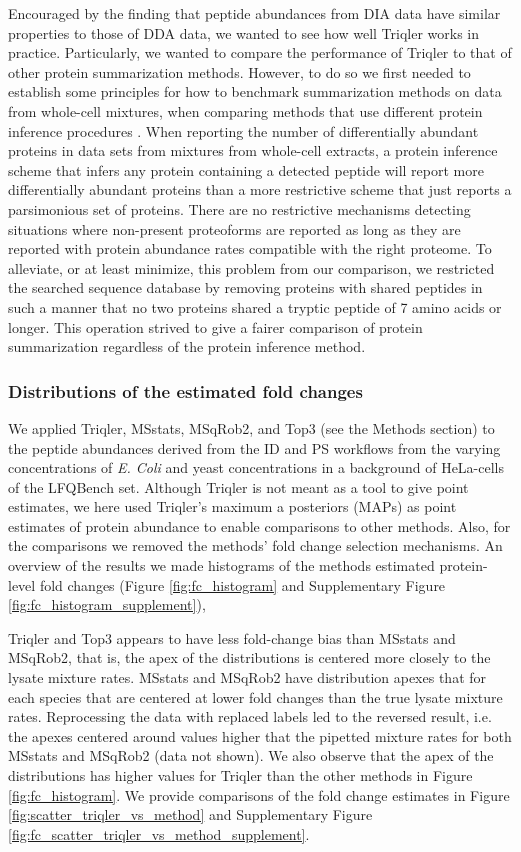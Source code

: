 \documentclass[10pt,letterpaper]{article}
\begin{document}
Encouraged by the finding that peptide abundances from DIA data have similar properties to those of DDA data, we wanted to see how well Triqler works in practice. Particularly, we wanted to compare the performance of Triqler to that of other protein summarization methods. However, to do so we first needed to establish some principles for how to benchmark summarization methods on data from whole-cell mixtures, when comparing methods that use different protein inference procedures \cite{serang2012recognizing}. When reporting the number of differentially abundant proteins in data sets from mixtures from whole-cell extracts, a protein inference scheme that infers any protein containing a detected peptide will report more differentially abundant proteins than a more restrictive scheme that just reports a parsimonious set of proteins. There are no restrictive mechanisms detecting situations where non-present proteoforms are reported as long as they are reported with protein abundance rates compatible with the right proteome. To alleviate, or at least minimize, this problem from our comparison, we restricted the searched sequence database by removing proteins with shared peptides in such a manner that no two proteins shared a tryptic peptide of 7 amino acids or longer. This operation strived to give a fairer comparison of protein summarization regardless of the protein inference method. 

\subsubsection*{Distributions of the estimated fold changes}

We applied Triqler, MSstats, MSqRob2, and Top3 (see the Methods section) to the peptide abundances derived from the ID and PS workflows from the varying concentrations of {\em E. Coli} and yeast concentrations in a background of HeLa-cells of the LFQBench set. Although Triqler is not meant as a tool to give point estimates, we here used Triqler's maximum a posteriors (MAPs) as point estimates of protein abundance to enable comparisons to other methods. Also, for the comparisons we removed the methods' fold change selection mechanisms. An overview of the results we made histograms of the methods estimated protein-level fold changes (Figure \ref{fig:fc_histogram} and Supplementary Figure \ref{fig:fc_histogram_supplement}), 

Triqler and Top3 appears to have less fold-change bias than MSstats and MSqRob2, that is, the apex of the distributions is centered more closely to the lysate mixture rates. MSstats and MSqRob2 have distribution apexes that for each species that are centered at lower fold changes than the true lysate mixture rates. Reprocessing the data with replaced labels led to the reversed result, i.e. the apexes centered around values higher that the pipetted mixture rates for both MSstats and MSqRob2 (data not shown).  We also observe that the apex of the distributions has higher values for Triqler than the other methods in Figure \ref{fig:fc_histogram}. We provide comparisons of the fold change estimates in Figure \ref{fig:scatter_triqler_vs_method} and Supplementary Figure \ref{fig:fc_scatter_triqler_vs_method_supplement}.
\end{document}
